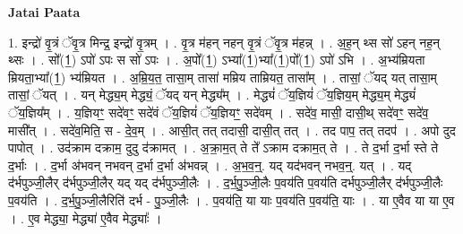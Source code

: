\documentclass[17pt]{extarticle}
\begin{document}
\textbf{Jatai Paata} \newline

1. इन्द्रो॑ वृ॒त्रं ॅवृ॒त्र मिन्द्र॒ इन्द्रो॑ वृ॒त्रम् । . वृ॒त्र म॑हन् नहन् वृ॒त्रं ॅवृ॒त्र म॑हन्न् । . अ॒ह॒न् थ्स सो॑ ऽहन् नह॒न् थ्सः । . सो᳚(1॒) ऽपो॑ ऽपः स सो॑ ऽपः । . अ॒पो᳚(1॒) ऽभ्या᳚(1॒)भ्या᳚(1॒)पो᳚(1॒) ऽपो॑ ऽभि । . अ॒भ्य॑म्रियता म्रियता॒भ्या᳚(1॒) भ्य॑म्रियत । . अ॒म्रि॒य॒त॒ तासा॒म् तासा॑ मम्रिय ताम्रियत॒ तासा᳚म् । . तासां॒ ॅयद् यत् तासा॒म् तासां॒ ॅयत् । . यन् मेद्ध्य॒म् मेद्ध्यं॒ ॅयद् यन् मेद्ध्य᳚म् । . मेद्ध्यं॑ ॅय॒ज्ञियं॑ ॅय॒ज्ञिय॒म् मेद्ध्य॒म् मेद्ध्यं॑ ॅय॒ज्ञिय᳚म् । . य॒ज्ञियꣳ॒॒ सदे॑वꣳ॒॒ सदे॑वं ॅय॒ज्ञियं॑ ॅय॒ज्ञियꣳ॒॒ सदे॑वम् । . सदे॑व॒ मासी॒ दासी॒थ् सदे॑वꣳ॒॒ सदे॑व॒ मासी᳚त् । . सदे॑व॒मिति॒ स - दे॒व॒म् । . आसी॒त् तत् तदासी॒ दासी॒त् तत् । . तद पाप॒ तत् तदप॑ । . अपो दुद पापोत् । . उद॑क्राम दक्राम॒ दुदु द॑क्रामत् । . अ॒क्रा॒म॒त् ते ते᳚ ऽक्राम दक्राम॒त् ते । . ते द॒र्भा द॒र्भा स्ते ते द॒र्भाः । . द॒र्भा अ॑भवन् नभवन् द॒र्भा द॒र्भा अ॑भवन्न् । . अ॒भ॒व॒न्॒. यद् यद॑भवन् नभव॒न्॒. यत् । . यद् द॑र्भपुञ्जी॒लैर् द॑र्भपुञ्जी॒लैर् यद् यद् द॑र्भपुञ्जी॒लैः । . द॒र्भ॒पु॒ञ्जी॒लैः प॒वय॑ति प॒वय॑ति दर्भपुञ्जी॒लैर् द॑र्भपुञ्जी॒लैः प॒वय॑ति । . द॒र्भ॒पु॒ञ्जी॒लैरिति॑ दर्भ - पु॒ञ्जी॒लैः । . प॒वय॑ति॒ या याः प॒वय॑ति प॒वय॑ति॒ याः । . या ए॒वैव या या ए॒व । . ए॒व मेद्ध्या॒ मेद्ध्या॑ ए॒वैव मेद्ध्याः᳚ । \newline
\end{document}
